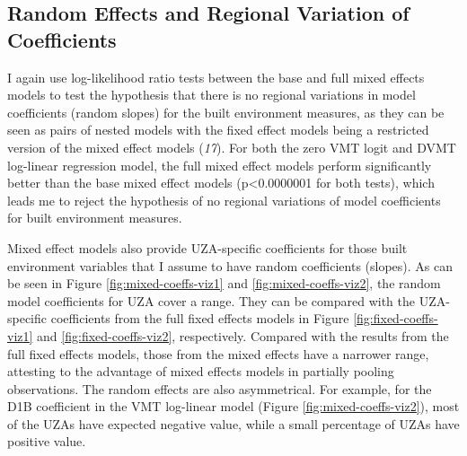 \documentclass[numbered]{trbunofficial}
\begin{document}
\hypertarget{random-effects-and-regional-variation-of-coefficients}{%
\subsection{Random Effects and Regional Variation of Coefficients}\label{random-effects-and-regional-variation-of-coefficients}}

I again use log-likelihood ratio tests between the base and full mixed effects models to test the hypothesis that there is no regional variations in model coefficients (random slopes) for the built environment measures, as they can be seen as pairs of nested models with the fixed effect models being a restricted version of the mixed effect models (\emph{17}). For both the zero VMT logit and DVMT log-linear regression model, the full mixed effect models perform significantly better than the base mixed effect models (p\textless0.0000001 for both tests), which leads me to reject the hypothesis of no regional variations of model coefficients for built environment measures.

Mixed effect models also provide UZA-specific coefficients for those built environment variables that I assume to have random coefficients (slopes). As can be seen in Figure \ref{fig:mixed-coeffs-viz1} and \ref{fig:mixed-coeffs-viz2}, the random model coefficients for UZA cover a range. They can be compared with the UZA-specific coefficients from the full fixed effects models in Figure \ref{fig:fixed-coeffs-viz1} and \ref{fig:fixed-coeffs-viz2}, respectively. Compared with the results from the full fixed effects models, those from the mixed effects have a narrower range, attesting to the advantage of mixed effects models in partially pooling observations. The random effects are also asymmetrical. For example, for the D1B coefficient in the VMT log-linear model (Figure \ref{fig:mixed-coeffs-viz2}), most of the UZAs have expected negative value, while a small percentage of UZAs have positive value.
\end{document}
